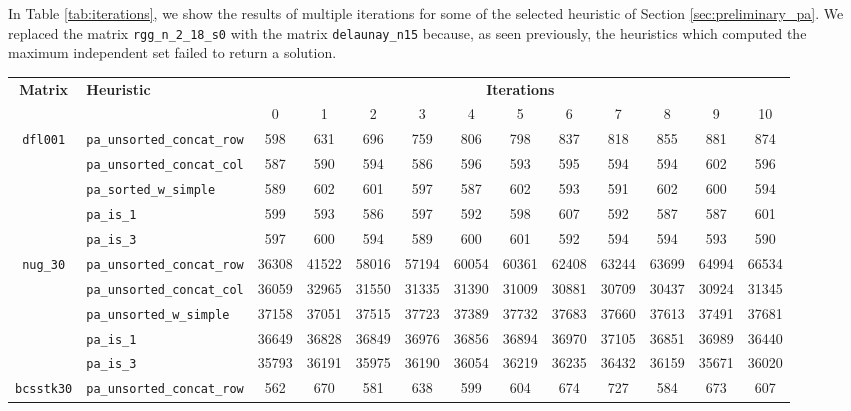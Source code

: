 In Table \ref{tab:iterations}, we show the results of multiple iterations for some of the selected heuristic of Section \ref{sec:preliminary_pa}. We replaced the matrix \verb|rgg_n_2_18_s0| with the matrix \verb|delaunay_n15| because, as seen previously, the heuristics which computed the maximum independent set failed to return a solution.


\begin{sidewaystable}[h]
	\centering
	\renewcommand{\arraystretch}{1.2}
	\begin{tabular}{|c|l|c||c|c|c|c|c|c|c|c|c|c|}
		\hline
		\multirow{2}{*}{\textbf{Matrix}} &\multirow{2}{*}{\textbf{Heuristic}} & \multicolumn{11}{c|}{\textbf{Iterations}} \\ \cline{3-13} 
		&& 0 & 1 & 2 & 3 & 4 & 5 & 6 & 7 & 8 & 9 & 10 \\ \hline
		\multirow{5}{*}{\texttt{dfl001}}		&\verb|pa_unsorted_concat_row| & 598 & 631 & 696 & 759 & 806 & 798 & 837 & 818 & 855 & 881 & 874 \\ 
		&\verb|pa_unsorted_concat_col| &  587&  590 & 594 & 586 & 596 & 593 & 595 & 594 & 594 & 602 & 596 \\ 
		&\verb|pa_sorted_w_simple| & 589 & 602 & 601 & 597 & 587 & 602 & 593 & 591 & 602 & 600 & 594 \\
		&\verb|pa_is_1| & 599 & 593 & 586 & 597 & 592 & 598 & 607 & 592 & 587 & 587  & 601 \\
		&\verb|pa_is_3| & 597 & 600 & 594 & 589 & 600 & 601 & 592 & 594 & 594 & 593 & 590 \\
		\hline
			\multirow{5}{*}{\texttt{nug\_30}}		&\verb|pa_unsorted_concat_row| & 	36308 & 41522 & 58016 & 57194 & 60054 & 60361 & 62408 & 63244 & 63699 & 64994 & 66534 \\ 
		&\verb|pa_unsorted_concat_col| & 36059 & 32965&  31550 & 31335 & 31390 & 31009 & 30881 & 30709 & 30437 & 30924 & 31345 \\
		&\verb|pa_unsorted_w_simple| & 37158 & 37051 & 37515 & 37723 & 37389 & 37732 & 37683 & 37660 & 37613 & 37491 & 37681 \\
		&\verb|pa_is_1| & 	36649 & 36828 & 36849 & 36976 & 36856 & 36894 & 36970 & 37105 & 36851 & 36989 & 36440 \\
		&\verb|pa_is_3| & 35793 & 36191 & 35975 & 36190 & 36054 & 36219 & 36235 & 36432 & 36159 & 35671 & 36020 \\ \hline
		\multirow{5}{*}{\texttt{bcsstk30}}		&\verb|pa_unsorted_concat_row| &  562 & 670 & 581&  638 &  599 &  604 &  674 &  727&   584&   673 &  607 \\ 

\end{tabular}
\end{sidewaystable}
